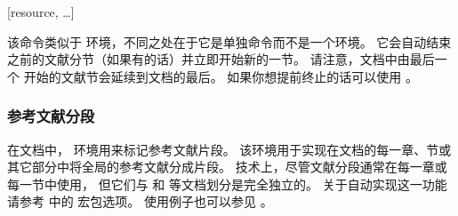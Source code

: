 \begin{ltxsyntax}
[resource, \dots]


该命令类似于  环境，不同之处在于它是单独命令而不是一个环境。
它会自动结束之前的文献分节（如果有的话）并立即开始新的一节。
请注意，文档中由最后一个  开始的文献节会延续到文档的最后。
如果你想提前终止的话可以使用 。

\end{ltxsyntax}

\subsubsection{参考文献分段}%
\label{use:bib:seg}


在文档中， 环境用来标记参考文献片段。
该环境用于实现在文档的每一章、节或其它部分中将全局的参考文献分成片段。
技术上，尽管文献分段通常在每一章或每一节中使用，
但它们与  和  等文档划分是完全独立的。
关于自动实现这一功能请参考  中的  宏包选项。
使用例子也可以参见 。


